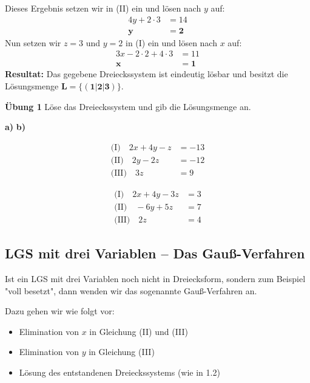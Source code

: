 \documentclass{article}
\begin{document}
Dieses Ergebnis setzen wir in (II) ein und lösen nach $y$ auf:
\begin{align*}
4y + 2 \cdot 3 &= 14\\
\mathbf{y} &= \mathbf{2}
\end{align*}
Nun setzen wir $z = 3$ und $y = 2$ in (I) ein und lösen nach $x$ auf:
\begin{align*}
3x - 2 \cdot 2 + 4 \cdot 3 &= 11\\
\mathbf{x} &= \mathbf{1}
\end{align*}
\textbf{Resultat:} Das gegebene Dreieckssystem ist eindeutig lösbar und besitzt die Lösungsmenge $\mathbf{L = \{(1|2|3)\}}$.

\textbf{Übung 1} Löse das Dreieckssystem und gib die Lösungsmenge an.

\textbf{a)} \hfill \textbf{b)}
\begin{minipage}[t]{0.48\textwidth}
\begin{align*}
\text{(I)} \quad 2x + 4y - z &= -13\\
\text{(II)} \quad 2y - 2z &= -12\\
\text{(III)} \quad 3z &= 9
\end{align*}
\end{minipage}%
\hfill%
\begin{minipage}[t]{0.48\textwidth}
\begin{align*}
\text{(I)} \quad 2x + 4y - 3z &= 3\\
\text{(II)} \quad -6y + 5z &= 7\\
\text{(III)} \quad 2z &= 4
\end{align*}
\end{minipage}

\subsection{LGS mit drei Variablen – Das Gauß-Verfahren}

Ist ein LGS mit drei Variablen noch nicht in Dreiecksform, sondern zum Beispiel "voll besetzt", dann wenden wir das sogenannte Gauß-Verfahren an.

Dazu gehen wir wie folgt vor:
\begin{itemize}
\item Elimination von $x$ in Gleichung (II) und (III)
\item Elimination von $y$ in Gleichung (III)
\item Lösung des entstandenen Dreieckssystems (wie in 1.2)
\end{itemize}
\end{document}
